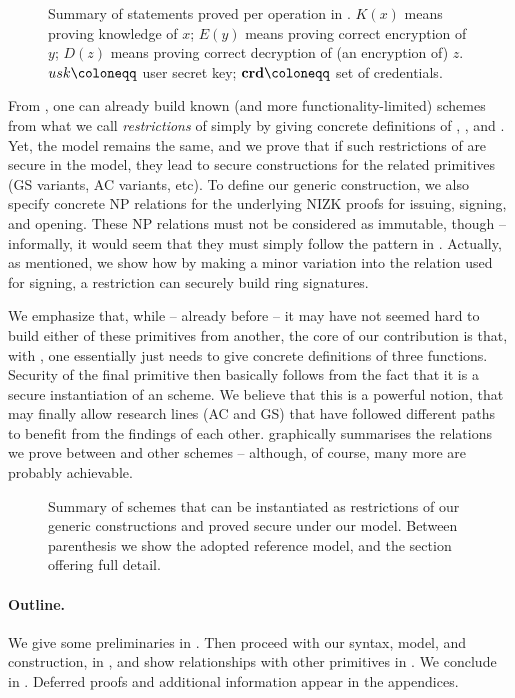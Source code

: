 \begin{figure}[ht!]
  \centering
  \scalebox{0.9}{
    
  }
  \caption{Summary of statements proved per operation in \UAS.
    $K(x)$ means proving knowledge of $x$; $E(y)$ means proving correct
    encryption of $y$; $D(z)$ means proving correct decryption of (an encryption
    of) $z$. $\usk \coloneqq$ user secret key; $\scred \coloneqq$ set of
    credentials.}
  \label{fig:proof-blocks-uas}
\end{figure}

From \CUASGen, one can already build known (and more functionality-limited)
schemes from what we call \emph{restrictions} of \CUASGen simply by giving
concrete definitions of \fissue, \feval, and \finsp. Yet, the model remains the
same, and we prove that if such restrictions of \CUASGen are secure in the \UAS
model, they lead to secure constructions for the related primitives (GS
variants, AC variants, etc). To define our generic construction, we also specify
concrete NP relations for the underlying NIZK proofs for issuing, signing, and
opening. These NP relations must not be considered as immutable, though --
informally, it would seem that they must simply follow the pattern in
. Actually, as mentioned, we show how by making a
minor variation into the relation used for signing, a \CUASGen restriction can
securely build ring signatures.

We emphasize that, while -- already before \UAS -- it may have not seemed hard
to build either of these primitives from another, the core of our contribution
is that, with \UAS, one essentially just needs to give concrete definitions of
three functions. Security of the final primitive then basically follows from
the fact that it is a secure instantiation of an \UAS scheme. We believe that
this is a powerful notion, that may finally allow research lines (AC and GS)
that have followed different paths to benefit from the findings of each other.
 graphically summarises the relations we prove between
\UAS and other schemes -- although, of course, many more are probably
achievable.

\begin{figure}[ht!]
  \centering
  \scalebox{0.9}{
    
  }
  \caption{Summary of schemes that can be instantiated as restrictions of our
    generic constructions and proved secure under our \UAS model. Between
    parenthesis we show the adopted reference model, and the section offering
    full detail.}
  \label{fig:relations}
\end{figure}

\paragraph{Outline.} %
We give some preliminaries in . Then proceed with our
\UAS syntax, model, and construction, in , and show
relationships with other primitives in . We conclude
in . Deferred proofs and additional information appear
in the appendices.

